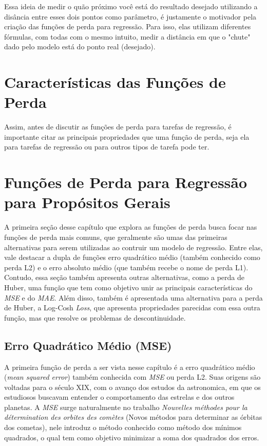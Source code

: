 Essa ideia de medir o quão próximo você está do resultado desejado utilizando a disância entre esses dois pontos como parâmetro, é justamente o motivador pela criação das funções de perda para regressão. Para isso, elas utilizam diferentes fórmulas, com todas com o mesmo intuito, medir a distância em que o "chute" dado pelo modelo está do ponto real (desejado).

\section{Características das Funções de Perda}

Assim, antes de discutir as funções de perda para tarefas de regressão, é importante citar as principais propriedades que uma função de perda, seja ela para tarefas de regressão ou para outros tipos de tarefa pode ter.

\section{Funções de Perda para Regressão para Propósitos Gerais}

A primeira seção desse capítulo que explora as funções de perda busca focar nas funções de perda mais comuns, que geralmente são umas das primeiras alternativas para serem utilizadas ao contruir um modelo de regressão. Entre elas, vale destacar a dupla de funções erro quadrático médio (também conhecido como perda L2) e o erro absoluto médio (que também recebe o nome de perda L1). Contudo, essa seção também apresenta outras alternativas, como a perda de Huber, uma função que tem como objetivo unir as principais características do \textit{MSE} e do \textit{MAE}. Além disso, também é apresentada uma alternativa para a perda de Huber, a Log-Cosh \textit{Loss}, que apresenta propriedades parecidas com essa outra função, mas que resolve os problemas de descontinuidade.

\subsection{Erro Quadrático Médio (MSE)} 

A primeira função de perda a ser vista nesse capítulo é a erro quadrático médio (\textit{mean squared error}) também conhecida com \textit{MSE} ou perda L2. Suas origens são voltadas para o século XIX, com o avanço dos estudos da astronomica, em que os estudiosos buscavam entender o comportamento das estrelas e dos outros planetas. A \textit{MSE} surge naturalmente no trabalho \textit{Nouvelles méthodes pour la détermination des orbites des comètes} (Novos métodos para determinar as órbitas dos cometas), nele \textcite{Legendre1805} introduz o método conhecido como método dos mínimos quadrados, o qual tem como objetivo minimizar a soma dos quadrados dos erros.

